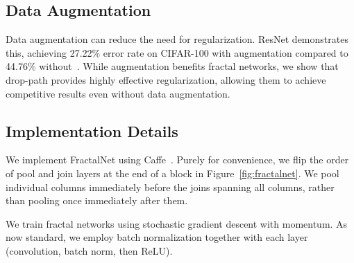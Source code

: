 \documentclass{article}
\newcommand{\fracnet}{FractalNet}
\newcommand{\droppath}{drop-path}
\newcommand{\Resnet}{ResNet}
\begin{document}
\subsection{Data Augmentation}
\label{sec:data-aug}

Data augmentation can reduce the need for regularization.  {\Resnet}
demonstrates this, achieving 27.22\% error rate on CIFAR-100 with augmentation
compared to 44.76\% without~\citep{huang2016stochasticdepth}.  While
augmentation benefits fractal networks, we show that {\droppath} provides
highly effective regularization, allowing them to achieve competitive results
even without data augmentation.

\subsection{Implementation Details}
\label{sec:implementation}

We implement {\fracnet} using Caffe~\citep{caffe14}.  Purely for convenience,
we flip the order of pool and join layers at the end of a block in
Figure~\ref{fig:fractalnet}.  We pool individual columns immediately before
the joins spanning all columns, rather than pooling once immediately after
them.

We train fractal networks using stochastic gradient descent with momentum.  As
now standard, we employ batch normalization together with each 
layer (convolution, batch norm, then ReLU).
 
\end{document}
